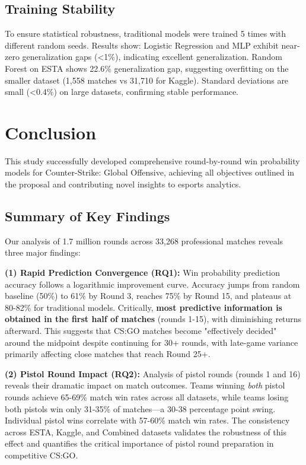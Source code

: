 \documentclass[10pt,twocolumn]{article}
\begin{document}
\subsection{Training Stability}
To ensure statistical robustness, traditional models were trained 5 times with different random seeds. Results show: Logistic Regression and MLP exhibit near-zero generalization gaps (<1\%), indicating excellent generalization. Random Forest on ESTA shows 22.6\% generalization gap, suggesting overfitting on the smaller dataset (1,558 matches vs 31,710 for Kaggle). Standard deviations are small (<0.4\%) on large datasets, confirming stable performance.

\section{Conclusion}

This study successfully developed comprehensive round-by-round win probability models for Counter-Strike: Global Offensive, achieving all objectives outlined in the proposal and contributing novel insights to esports analytics.

\subsection{Summary of Key Findings}

Our analysis of 1.7 million rounds across 33,268 professional matches reveals three major findings:

\textbf{(1) Rapid Prediction Convergence (RQ1):} Win probability prediction accuracy follows a logarithmic improvement curve. Accuracy jumps from random baseline (50\%) to 61\% by Round 3, reaches 75\% by Round 15, and plateaus at 80-82\% for traditional models. Critically, \textbf{most predictive information is obtained in the first half of matches} (rounds 1-15), with diminishing returns afterward. This suggests that CS:GO matches become "effectively decided" around the midpoint despite continuing for 30+ rounds, with late-game variance primarily affecting close matches that reach Round 25+.

\textbf{(2) Pistol Round Impact (RQ2):} Analysis of pistol rounds (rounds 1 and 16) reveals their dramatic impact on match outcomes. Teams winning \textit{both} pistol rounds achieve 65-69\% match win rates across all datasets, while teams losing both pistols win only 31-35\% of matches---a 30-38 percentage point swing. Individual pistol wins correlate with 57-60\% match win rates. The consistency across ESTA, Kaggle, and Combined datasets validates the robustness of this effect and quantifies the critical importance of pistol round preparation in competitive CS:GO.
\end{document}
